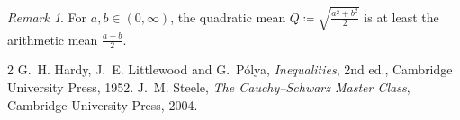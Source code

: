 \documentclass{article}
\theoremstyle{remark}
\newtheorem{remark}[theorem]{Remark}
\begin{document}
\begin{remark}\label{rem:quadratic}
For $a,b\in(0,\infty)$, the quadratic mean $Q\coloneqq\sqrt{\frac{a^2+b^2}{2}}$ is at least the arithmetic mean $\frac{a+b}{2}$.
\end{remark}

\begin{thebibliography}{2}
 G.~H. Hardy, J.~E. Littlewood and G.~P\'olya, \emph{Inequalities}, 2nd ed., Cambridge University Press, 1952.
 J.~M. Steele, \emph{The Cauchy--Schwarz Master Class}, Cambridge University Press, 2004.
\end{thebibliography}
\end{document}
